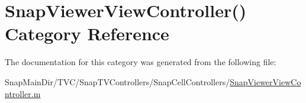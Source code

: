\hypertarget{category_snap_viewer_view_controller_07_08}{}\section{Snap\+Viewer\+View\+Controller() Category Reference}
\label{category_snap_viewer_view_controller_07_08}


The documentation for this category was generated from the following file\+:\begin{DoxyCompactItemize}
\item 
Snap\+Main\+Dir/\+T\+V\+C/\+Snap\+T\+V\+Controllers/\+Snap\+Cell\+Controllers/\hyperlink{_snap_viewer_view_controller_8m}{Snap\+Viewer\+View\+Controller.\+m}\end{DoxyCompactItemize}
